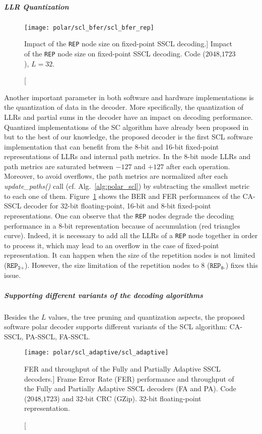 \subparagraph{LLR Quantization}

\begin{figure}[htp]
  \centering
  \texttt{[image: polar/scl\_bfer/scl\_bfer\_rep]}
  \caption
    [Impact of the \texttt{REP} node size on fixed-point SSCL decoding.]
    {Impact of the \texttt{REP} node size on fixed-point SSCL decoding.
    Code ($2048$,$1723$), $L=32$.}
  \label{plot:polar_scl_bfer_rep}
\end{figure}

Another important parameter in both software and hardware implementations is the
quantization of data in the decoder. More specifically, the quantization of LLRs
and partial sums in the decoder have an impact on decoding performance.
Quantized implementations of the SC algorithm have already been proposed
in~\cite{Giard2016} but to the best of our knowledge, the proposed decoder is
the first SCL software implementation that can benefit from the 8-bit and 16-bit
fixed-point representations of LLRs and internal path metrics. In the 8-bit mode
LLRs and path metrics are saturated between $-127$ and $+127$ after each
operation. Moreover, to avoid overflows, the path metrics are normalized after
each \textit{update\_paths()} call (cf. Alg.~\ref{alg:polar_scl}) by subtracting
the smallest metric to each one of them. Figure~\ref{plot:polar_scl_bfer_rep}
shows the BER and FER performances of the CA-SSCL decoder for 32-bit
floating-point, 16-bit and 8-bit fixed-point representations. One can observe
that the \verb|REP| nodes degrade the decoding performance in a 8-bit
representation because of accumulation (red triangles curve). Indeed, it is
necessary to add all the LLRs of a \verb|REP| node together in order to process
it, which may lead to an overflow in the case of fixed-point representation. It
can happen when the size of the repetition nodes is not limited
($\texttt{REP}_\texttt{2+}$). However, the size limitation of the repetition
nodes to 8 ($\texttt{REP}_\texttt{8-}$) fixes this issue.

\subparagraph{Supporting different variants of the decoding algorithms}

Besides the $L$ values, the tree pruning and quantization aspects, the proposed
software polar decoder supports different variants of the SCL algorithm:
CA-SSCL, PA-SSCL, FA-SSCL.

\begin{figure}[htp]
  \centering
  \texttt{[image: polar/scl\_adaptive/scl\_adaptive]}
  \caption
    [FER and throughput of the Fully and Partially Adaptive SSCL decoders.]
    {Frame Error Rate (FER) performance and throughput of the Fully and
    Partially Adaptive SSCL decoders (FA and PA). Code ($2048$,$1723$) and
    32-bit CRC (GZip). 32-bit floating-point representation.}
  \label{plot:polar_scl_adaptive}
\end{figure}


